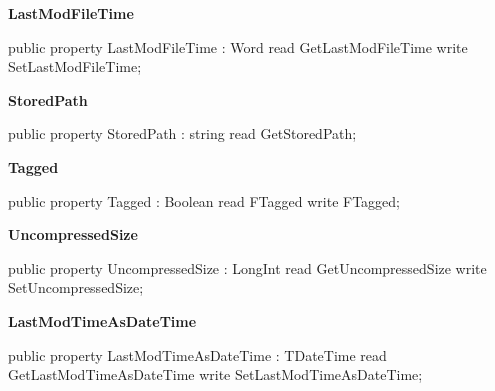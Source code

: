 \documentclass{report}
\newif\ifpdf
\begin{document}
\begin{list}{}
\begin{flushleft}
\ifpdf
\end{flushleft}
\fi


\par  \label{AbArcTyp.TAbArchiveItem-LastModFileTime}
\item[\textbf{LastModFileTime}\hfill]
\ifpdf
\begin{flushleft}
\fi
\begin{ttfamily}
public property LastModFileTime : Word
      read GetLastModFileTime
      write SetLastModFileTime;\end{ttfamily}

\ifpdf
\end{flushleft}
\fi


\par  \label{AbArcTyp.TAbArchiveItem-StoredPath}
\item[\textbf{StoredPath}\hfill]
\ifpdf
\begin{flushleft}
\fi
\begin{ttfamily}
public property StoredPath : string
      read GetStoredPath;\end{ttfamily}

\ifpdf
\end{flushleft}
\fi


\par  \label{AbArcTyp.TAbArchiveItem-Tagged}
\item[\textbf{Tagged}\hfill]
\ifpdf
\begin{flushleft}
\fi
\begin{ttfamily}
public property Tagged : Boolean
      read FTagged
      write FTagged;\end{ttfamily}

\ifpdf
\end{flushleft}
\fi


\par  \label{AbArcTyp.TAbArchiveItem-UncompressedSize}
\item[\textbf{UncompressedSize}\hfill]
\ifpdf
\begin{flushleft}
\fi
\begin{ttfamily}
public property UncompressedSize : LongInt
      read GetUncompressedSize
      write SetUncompressedSize;\end{ttfamily}

\ifpdf
\end{flushleft}
\fi


\par  \label{AbArcTyp.TAbArchiveItem-LastModTimeAsDateTime}
\item[\textbf{LastModTimeAsDateTime}\hfill]
\ifpdf
\begin{flushleft}
\fi
\begin{ttfamily}
public property LastModTimeAsDateTime : TDateTime                           
      read GetLastModTimeAsDateTime                                      
      write SetLastModTimeAsDateTime;\end{ttfamily}

\ifpdf
\end{flushleft}
\fi


\par  \end{list}
\end{document}
